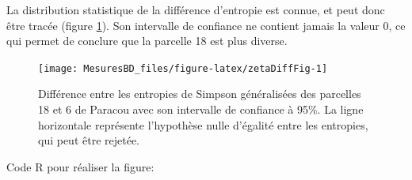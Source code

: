 \documentclass[
  11pt,
  french,
  a4paper,
  extrafontsizes,onecolumn,openright
  ]{memoir}
\newenvironment{Shaded}{\begin{snugshade}}{\end{snugshade}}
\newcommand{\AttributeTok}[1]{\textcolor[rgb]{0.13,0.29,0.53}{#1}}
\newcommand{\CommentTok}[1]{\textcolor[rgb]{0.56,0.35,0.01}{\textit{#1}}}
\newcommand{\DecValTok}[1]{\textcolor[rgb]{0.00,0.00,0.81}{#1}}
\newcommand{\FloatTok}[1]{\textcolor[rgb]{0.00,0.00,0.81}{#1}}
\newcommand{\FunctionTok}[1]{\textcolor[rgb]{0.13,0.29,0.53}{\textbf{#1}}}
\newcommand{\NormalTok}[1]{#1}
\newcommand{\OtherTok}[1]{\textcolor[rgb]{0.56,0.35,0.01}{#1}}
\newcommand{\SpecialCharTok}[1]{\textcolor[rgb]{0.81,0.36,0.00}{\textbf{#1}}}
\newcommand{\StringTok}[1]{\textcolor[rgb]{0.31,0.60,0.02}{#1}}
\begin{document}
\normalsize

La distribution statistique de la différence d'entropie est connue, et peut donc être tracée (figure \ref{fig:zetaDiffFig}).
Son intervalle de confiance ne contient jamais la valeur 0, ce qui permet de conclure que la parcelle 18 est plus diverse.



\scriptsize

\begin{figure}

{\centering \texttt{[image: MesuresBD\_files/figure-latex/zetaDiffFig-1]} 

}

\caption{Différence entre les entropies de Simpson généralisées des parcelles 18 et 6 de Paracou avec son intervalle de confiance à 95\%. La ligne horizontale représente l'hypothèse nulle d'égalité entre les entropies, qui peut être rejetée.}\label{fig:zetaDiffFig}
\end{figure}

\normalsize

Code R pour réaliser la figure:

\scriptsize

\begin{Shaded}
\end{Shaded}
\end{document}
